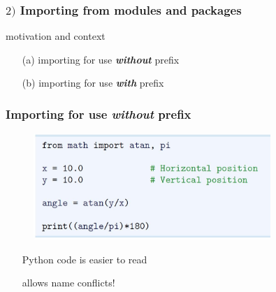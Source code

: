 \documentclass[14pt]{beamer}
\newcommand\red[1]{{\color{red} #1}}
\newcommand\green[1]{{\color{green} #1}}
\newcommand{\cmark}{\ding{51}}%
\newcommand{\xmark}{\ding{55}}%
\begin{document}
\begin{frame}[fragile]
\frametitle{$2)$ Importing from modules and packages}

motivation and context


\begin{itemize}
\item[(a)] importing for use \textbf{\emph{without}} prefix %

\item[(b)] importing for use \textbf{\emph{with}} prefix %
\end{itemize}

\end{frame}


\begin{frame}[fragile]
\frametitle{Importing for use \emph{without} prefix}

\begin{figure}[ht]
	\centering
	\includegraphics[width=0.8\textwidth]{figures/LLp13b}
\end{figure}
\begin{itemize}
\item[\green{\cmark}] Python code is easier to read
\item[\red{\xmark}] allows name conflicts!
\end{itemize}


\end{frame}
\end{document}
